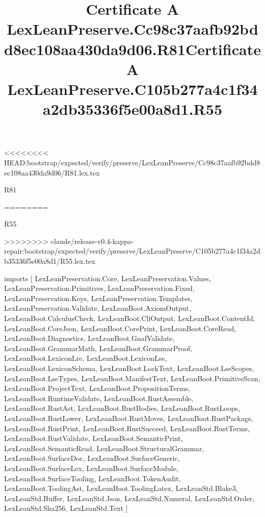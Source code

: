 <<<<<<<< HEAD:bootstrap/expected/verify/preserve/LexLeanPreserve/Cc98c37aafb92bdd8ec108aa430da9d06/R81.lex.tex
\begin{lexlean}{R81}
\title{Certificate A LexLeanPreserve.Cc98c37aafb92bdd8ec108aa430da9d06.R81}
========
\begin{lexlean}{R55}
\title{Certificate A LexLeanPreserve.C105b277a4c1f34a2db35336f5e00a8d1.R55}
>>>>>>>> claude/release-v0.4-kappa-repair:bootstrap/expected/verify/preserve/LexLeanPreserve/C105b277a4c1f34a2db35336f5e00a8d1/R55.lex.tex
\begin{coremodule}
imports [
  LexLeanPreservation.Core,
  LexLeanPreservation.Values,
  LexLeanPreservation.Primitives,
  LexLeanPreservation.Fixed,
  LexLeanPreservation.Keys,
  LexLeanPreservation.Templates,
  LexLeanPreservation.Validate,
  LexLeanBoot.AxiomOutput,
  LexLeanBoot.CalculusCheck,
  LexLeanBoot.CliOutput,
  LexLeanBoot.ContentId,
  LexLeanBoot.CoreJson,
  LexLeanBoot.CorePrint,
  LexLeanBoot.CoreRead,
  LexLeanBoot.Diagnostics,
  LexLeanBoot.GnafValidate,
  LexLeanBoot.GrammarMath,
  LexLeanBoot.GrammarProof,
  LexLeanBoot.LexiconLre,
  LexLeanBoot.LexiconLse,
  LexLeanBoot.LexiconSchema,
  LexLeanBoot.LockText,
  LexLeanBoot.LseScopes,
  LexLeanBoot.LseTypes,
  LexLeanBoot.ManifestText,
  LexLeanBoot.PrimitiveScan,
  LexLeanBoot.ProjectText,
  LexLeanBoot.PropositionTerms,
  LexLeanBoot.RuntimeValidate,
  LexLeanBoot.RustAssemble,
  LexLeanBoot.RustAst,
  LexLeanBoot.RustBodies,
  LexLeanBoot.RustLoops,
  LexLeanBoot.RustLower,
  LexLeanBoot.RustMoves,
  LexLeanBoot.RustPackage,
  LexLeanBoot.RustPrint,
  LexLeanBoot.RustSucceed,
  LexLeanBoot.RustTerms,
  LexLeanBoot.RustValidate,
  LexLeanBoot.SemanticPrint,
  LexLeanBoot.SemanticRead,
  LexLeanBoot.StructuralGrammar,
  LexLeanBoot.SurfaceDoc,
  LexLeanBoot.SurfaceGeneric,
  LexLeanBoot.SurfaceLex,
  LexLeanBoot.SurfaceModule,
  LexLeanBoot.SurfaceTooling,
  LexLeanBoot.TokenAudit,
  LexLeanBoot.ToolingAst,
  LexLeanBoot.ToolingLatex,
  LexLeanStd.Blake3,
  LexLeanStd.Buffer,
  LexLeanStd.Json,
  LexLeanStd.Numeral,
  LexLeanStd.Order,
  LexLeanStd.Sha256,
  LexLeanStd.Text
]


\end{coremodule}
\end{lexlean}
\end{lexlean}
